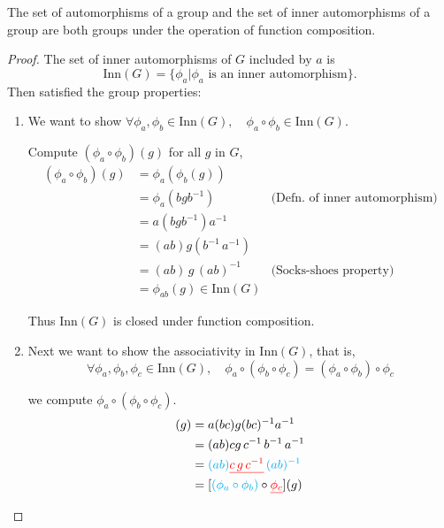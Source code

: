 \begin{theorem}
    The set of automorphisms of a group and the set of inner automorphisms of a group are both groups under the 
    operation of function composition.
\end{theorem}
\begin{proof}
    The set of inner automorphisms of $G$ included by $a$ is 
    \[
        \text{Inn}(G) = \{ \phi_a | \phi_a \text{ is an inner automorphism}  \}.
    \]
    Then satisfied the group properties:
    \begin{enumerate}
        \item We want to show $\forall \phi_a, \phi_b \in \text{Inn}(G), \quad \phi_a \circ \phi_b \in \text{Inn}(G)$.  

        Compute $(\phi_a \circ \phi_b)(g)$ for all $g$ in $G$,
        \begin{align*}
            (\phi_a \circ \phi_b)(g) &= \phi_a (\phi_b (g))\\
            &= \phi_a(bgb^{-1}) & \text{(Defn. of inner automorphism)}\\
            &= a(bgb^{-1})a^{-1}\\
            &= (ab)g(b^{-1}\, a^{-1})\\
            &= (ab)\, g\, (ab)^{-1} & \text{(Socks-shoes property)}\\
            &= \phi_{ab}(g) \in \text{Inn}(G)
        \end{align*}
        
        Thus $\text{Inn}(G)$ is closed under function composition.

        \item Next we want to show the associativity in $\text{Inn}(G)$, that is, 
        \[
            \forall \phi_a, \phi_b, \phi_c \in \text{Inn}(G), \quad \phi_a \circ (\phi_b \circ \phi_c) = (\phi_a \circ \phi_b) \circ \phi_c 
        \]

        we compute $\phi_a \circ (\phi_b \circ \phi_c)$.
        \begin{align*}
            [\phi_a \circ (\phi_b \circ \phi_c)](g) &= a(bc)g(bc)^{-1}a^{-1}\\
            &= (ab)c g \, c^{-1}\, b^{-1}\, a^{-1}\\
            &= {\color{cyan} (ab)}{\color{red} \underline{c\, g\, c^{-1}}}\, {\color{cyan} (ab)^{-1}}\\
            &= [{\color{cyan} (\phi_a \circ \phi_b)} \circ {\color{red} \underline{\phi_c}}](g)
        \end{align*}


\end{enumerate}
\end{proof}
